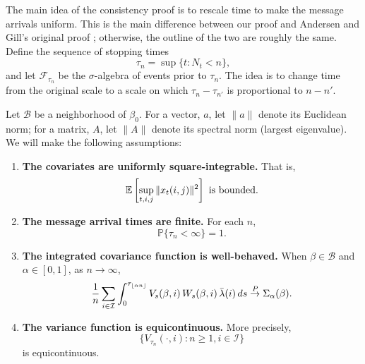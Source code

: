 \documentclass[aoas,preprint]{imsart}
\begin{document}
The main idea of the consistency proof is to rescale time to make the message
arrivals uniform.  This is the main difference between our proof and
Andersen and Gill's original proof \cite{andersen1982cox}; otherwise, the
outline of the two are roughly the same.  Define the sequence of stopping
times
\begin{equation}\label{E:message-times}
    \tau_n = \sup\{ t : N_t < n \},
\end{equation}
and let $\mathcal{F}_{\tau_n}$ be the $\sigma$-algebra of events prior to
$\tau_n$. The idea is to change time from the original scale to a scale on
which $\tau_{n} - \tau_{n'}$ is proportional to $n - n'$.

Let $\mathcal{B}$ be a neighborhood of $\beta_0$.  For a vector, $a$, let
$\| a \|$ denote its Euclidean norm; for a matrix, $A$, let $\| A \|$ denote
its spectral norm (largest eigenvalue).  We will make the following assumptions:
\begin{enumerate}[{A}1.]
    \item \label{A:square-int}
    \textbf{The covariates are uniformly square-integrable.}  That is,
    \[
        \mathbb{E}\left[
            \sup_{t, i, j} \| x_{t}(i,j) \|^2
        \right]
        \,\,\text{is bounded.}
    \]
    \item \label{A:message-times-finite}
    \textbf{The message arrival times are finite.}  For each $n$,
    \[
        \mathbb{P}\{\tau_n < \infty\} = 1.
    \]
    \item \label{A:integrated-cov-limit}
    \textbf{The integrated covariance function is well-behaved.}
    When $\beta \in \mathcal{B}$ and $\alpha \in [0,1]$, as $ n \to \infty$,
    \[
        \frac{1}{n}
        \sum_{i \in \mathcal{I}}
        \int_0^{\tau_{\lfloor \alpha n \rfloor}}
            V_s(\beta,i)
            \, W_s(\beta,i)
            \, \bar \lambda(i)
            \, ds
        \overset{\mathit{P}}{\to}
        \Sigma_\alpha(\beta).
    \]
    
    \item \label{A:var-equicont}
    \textbf{The variance function is equicontinuous.}
    More precisely,
    \[
        \Big\{
            V_{\tau_n}(\cdot, i)
            :
            n \geq 1, i \in \mathcal{I}
        \Big\}
    \]
    is equicontinuous.
\end{enumerate}
\end{document}
